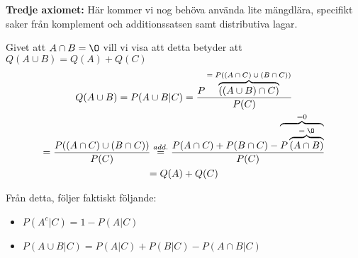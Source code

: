 \par\bigskip
\noindent\textbf{Tredje axiomet:} Här kommer vi nog behöva använda lite mängdlära, specifikt saker från komplement och additionssatsen samt distributiva lagar.\par
\noindent Givet att $A\cap B=\O$ vill vi visa att detta betyder att $Q(A\cup B) = Q(A)+Q(C)$ 
\begin{equation*}
  \begin{gathered}
    Q(A\cup B) = P(A\cup B|C)= \dfrac{P\overbrace{((A\cup B)\cap C)}^{\text{$=P((A\cap C)\cup(B\cap C))$}}}{P(C)}\\
    =\dfrac{P((A\cap C)\cup(B\cap C))}{P(C)}\stackrel{add.}{=}\dfrac{P(A\cap C)+P(B\cap C)-\overbrace{P\overbrace{(A\cap B)}^{\text{$=\O$}}}^{\text{=0}}}{P(C)}\\
    = Q(A)+Q(C)
  \end{gathered}
\end{equation*}
\par\bigskip
\noindent Från detta, följer faktiskt följande:
\begin{itemize}
  \item $P(A^c|C) = 1-P(A|C)$
  \item $P(A\cup B|C) = P(A|C)+P(B|C)-P(A\cap B|C)$
\end{itemize}

